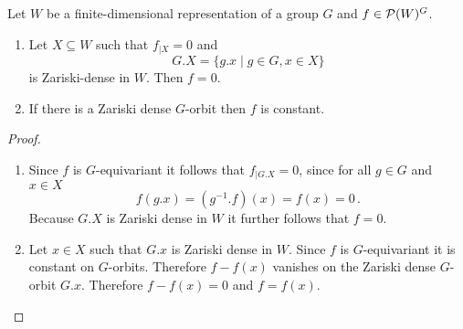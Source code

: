 \begin{lemma}\label{lemma: zariski density orbits}
  Let $W$ be a finite-dimensional representation of a group $G$ and $f \in \mathcal{P}(W)^G$.
  \begin{enumerate}[label=\emph{\alph*)},leftmargin=*]
    \item
      Let $X \subseteq W$ such that $f_{|X} = 0$ and
      \[
          G.X
        = \{
            g.x
          \mid
            g \in G,
            x \in X
          \}
      \]
      is Zariski-dense in $W$.
      Then $f = 0$.
    \item
      If there is a Zariski dense $G$-orbit then $f$ is constant.
  \end{enumerate}
\end{lemma}
\begin{proof}
  \begin{enumerate}[label=\emph{\alph*)},leftmargin=*]
    \item
      Since $f$ is $G$-equivariant it follows that $f_{|G.X} = 0$, since for all $g \in G$ and $x \in X$
      \[
          f(g.x)
        = \left( g^{-1}.f \right)(x)
        = f(x)
        = 0 \,.
      \]
      Because $G.X$ is Zariski dense in $W$ it further follows that $f = 0$.
    \item
      Let $x \in X$ such that $G.x$ is Zariski dense in $W$.
      Since $f$ is $G$-equivariant it is constant on $G$-orbits.
      Therefore $f - f(x)$ vanishes on the Zariski dense $G$-orbit $G.x$.
      Therefore $f - f(x) = 0$ and $f = f(x)$.
    \qedhere
  \end{enumerate}
\end{proof}


